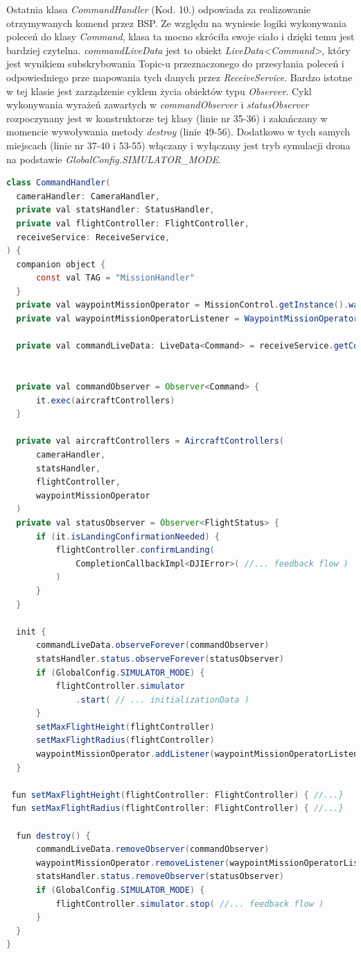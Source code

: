 Ostatnia klasa \textit{CommandHandler} (Kod. 10.) odpowiada za realizowanie otrzymywanych komend przez BSP. Ze względu na wyniesie logiki wykonywania poleceń do klasy \textit{Command}, klasa ta mocno skróciła swoje ciało i dzięki temu jest bardziej czytelna. \textit{commandLiveData} jest to obiekt \textit{LiveData<Command>}, który jest wynikiem subskrybowania Topic-u przeznaczonego do przesyłania poleceń i odpowiedniego prze mapowania tych danych przez \textit{ReceiveService}. Bardzo istotne w tej klasie jest zarządzenie cyklem życia obiektów typu \textit{Observer}. Cykl wykonywania wyrażeń zawartych w \textit{commandObserver} i \textit{statusObserver} rozpoczynany jest w konstruktorze tej klasy (linie nr 35-36) i zakańczany w momencie wywoływania metody \textit{destroy} (linie 49-56). Dodatkowo w tych samych miejscach (linie nr 37-40 i 53-55) włączany i wyłączany jest tryb symulacji drona na podstawie \textit{GlobalConfig.SIMULATOR\_MODE}.

\begin{lstlisting}[language=Java, caption=Klasa \textit{CommandHandler}]
class CommandHandler(
  cameraHandler: CameraHandler,
  private val statsHandler: StatusHandler,
  private val flightController: FlightController,
  receiveService: ReceiveService,
) {
  companion object {
      const val TAG = "MissionHandler"
  }
  private val waypointMissionOperator = MissionControl.getInstance().waypointMissionOperator
  private val waypointMissionOperatorListener = WaypointMissionOperatorListenerImpl()

  private val commandLiveData: LiveData<Command> = receiveService.getCommand()


  private val commandObserver = Observer<Command> {
      it.exec(aircraftControllers)
  }

  private val aircraftControllers = AircraftControllers(
      cameraHandler,
      statsHandler,
      flightController,
      waypointMissionOperator
  )
  private val statusObserver = Observer<FlightStatus> {
      if (it.isLandingConfirmationNeeded) {
          flightController.confirmLanding(
              CompletionCallbackImpl<DJIError>( //... feedback flow )
          )
      }
  }

  init {
      commandLiveData.observeForever(commandObserver)
      statsHandler.status.observeForever(statusObserver)
      if (GlobalConfig.SIMULATOR_MODE) {
          flightController.simulator
              .start( // ... initializationData )
      }
      setMaxFlightHeight(flightController)
      setMaxFlightRadius(flightController)
      waypointMissionOperator.addListener(waypointMissionOperatorListener)
  }

 fun setMaxFlightHeight(flightController: FlightController) { //...}
 fun setMaxFlightRadius(flightController: FlightController) { //...}

  fun destroy() {
      commandLiveData.removeObserver(commandObserver)
      waypointMissionOperator.removeListener(waypointMissionOperatorListener)
      statsHandler.status.removeObserver(statusObserver)
      if (GlobalConfig.SIMULATOR_MODE) {
          flightController.simulator.stop( //... feedback flow )
      }
  }
}
\end{lstlisting}

